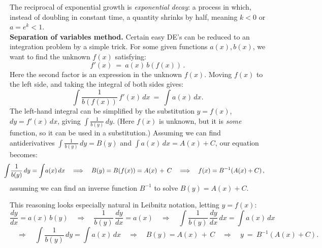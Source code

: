 \documentclass[11pt]{article}
\begin{document}
The reciprocal of exponential growth is {\it exponential decay}: a process in which,  instead of doubling in constant time, a quantity shrinks by half, meaning $k<0$ or $a=e^k<1$.
%
%
\\[1em]
{\bf Separation of variables method.} Certain easy DE's can be reduced to an integration problem by a simple trick. 
For some given functions $a(x),b(x)$, 
we want to find the unknown $f(x)$ satisfying:
$$
 f'(x)\ =\  a(x)\,b(f(x))\,.
$$
Here the second factor is an expression in the unknown $f(x)$.
Moving $f(x)$ to the left side, 
and taking the integral of both sides gives:
$$
\int\! \frac{1}{b(f(x))}\,f'(x)\,dx \ =\ \int\! a(x)\,dx.
$$
The left-hand integral can be simplified by the substitution $y=f(x)$,
$dy = f'(x)\,dx$, giving $\int\! \frac1{b(y)}\,dy$. 
(Here $f(x)$ is unknown, but it is {\it some} function, so it can be used in a substitution.) 
Assuming we can find antiderivatives $\int\!\! \frac1{b(y)}\,dy=B(y)$ and
$\int\! a(x)\,dx=A(x)+C$, our equation becomes:
$$
\hspace{-1em}
\int\! \frac{1}{b(y)}\,dy = \int\! a(x)\,dx
\quad\Longrightarrow\quad
B(y) = B(f(x))  = A(x)\,+\,C
\quad\Longrightarrow\quad
f(x) = B^{-1}(A(x)+C)\,,
$$
assuming we can find an inverse function $B^{-1}$ to solve $B(y)=A(x)+C$.

This reasoning looks especially natural in Leibnitz notation,
letting $y=f(x)$:
$$\hspace{0in}
\frac{dy}{dx} = a(x)\,b(y)
\quad\Longrightarrow\quad
 \frac{1}{b(y)}\,\frac{dy}{dx} = a(x)
\quad\Longrightarrow\quad
\int  \frac{1}{b(y)}\,\frac{dy}{dx}\,dx = \int a(x)\,dx
$$
$$\hspace{0in}
\quad\Longrightarrow\quad
\int  \frac{1}{b(y)}\,dy = \int a(x)\,dx
\quad\Longrightarrow\quad
B(y) = A(x)\,+\,C
\quad\Longrightarrow\quad
y\ =\ B^{-1}(A(x)+C).
$$

\pagebreak
\end{document}
